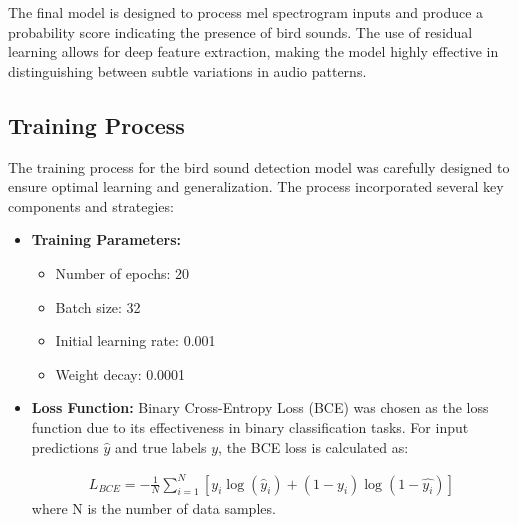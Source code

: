       The final model is designed to process mel spectrogram inputs and produce a probability score indicating the presence of bird sounds. The use of residual learning allows for deep feature extraction, making the model highly effective in distinguishing between subtle variations in audio patterns.
      
      

      \subsection{Training Process}
      The training process for the bird sound detection model was carefully designed to ensure optimal learning and generalization. The process incorporated several key components and strategies:
      \begin{itemize}
            \item \textbf{Training Parameters:}
            \begin{itemize}
                  \item Number of epochs: 20
                  \item Batch size: 32
                  \item Initial learning rate: 0.001
                  \item Weight decay: 0.0001
            \end{itemize}

            \item \textbf{Loss Function:}
            Binary Cross-Entropy Loss (BCE) was chosen as the loss function due to its effectiveness in binary classification tasks. For input predictions $\hat{y}$ and true labels $y$, the BCE loss is calculated as:
            
            
            \begin{eqnarray}
                  L_{BCE} = -\frac{1}{N}\sum_{i=1}^{N}[y_i\log(\hat{y}_i) + (1-y_i)\log(1-\hat{y_i})]
            \end{eqnarray}
                  where N is the number of data samples.


\end{itemize}
